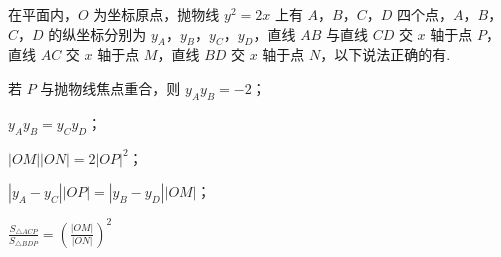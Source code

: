 \begin{problem}
在平面内，\(O\) 为坐标原点，抛物线 \(y^2=2x\) 上有 \(A\)，\(B\)，\(C\)，\(D\) 四个点，\(A\)，\(B\)，\(C\)，\(D\) 的纵坐标分别为 \(y_A\)，\(y_B\)，\(y_C\)，\(y_D\)，直线 \(AB\) 与直线 \(CD\) 交 \(x\) 轴于点 \(P\)，直线 \(AC\) 交 \(x\) 轴于点 \(M\)，直线 \(BD\) 交 \(x\) 轴于点 \(N\)，以下说法正确的有\fillinblank{}.

\begin{circlelist}
\item 若 \(P\) 与抛物线焦点重合，则 \(y_Ay_B=-2\)；
\item \(y_Ay_B=y_Cy_D\)；
\item \(|OM||ON|=2|OP|^2\)；
\item \(\left| y_A-y_C \right||OP|=\left| y_B-y_D \right||OM|\)；
\item \(\frac{S_{\triangle ACP}}{S_{\triangle BDP}}=\left( \frac{|OM|}{|ON|} \right)^2\)
\end{circlelist}
\end{problem}

\begin{answer}
\end{answer}

